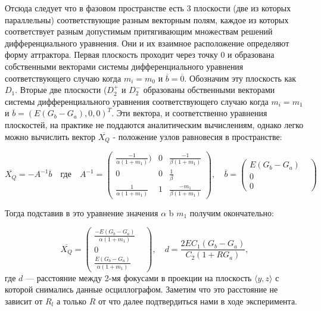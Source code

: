 \documentclass[12pt]{article}
\begin{document}
Отсюда следует что в фазовом пространстве есть 3 плоскости (две из которых параллельны) соответствующие разным  векторным полям, каждое из которых соответствует разным  допустимым притягивающим множествам решений дифференциального уравнения. Они и их взаимное расположение определяют  форму аттрактора. Первая плоскость проходит через точку 0 и образована собственными векторами системы дифференциального уравнения соответствующего случаю когда $m_i = m_0$ и $\overline{b} = \overline{0}$. Обозначим эту плоскость как $D_1$. Вторые две плоскости ($D_2^+$ и $D_2^-$ образованы  обственными векторами системы дифференциального уравнения соответствующего случаю когда $m_i = m_1$ и $\overline{b} = ( E(G_b - G_a),  0,  0)^{T}$. Эти вектора, и соответственно уравнения плоскостей, на практике не поддаются аналитическим вычислениям, однако легко можно вычислить вектор $\overline{X_Q}$  - положение узлов равновесия в пространстве:



\begin{equation}
	\overline{X_Q} = -A^{-1}\overline{b}
	\quad \textit{где} \quad A^{-1}=
	\begin{pmatrix}
		\frac{-1}{\alpha(1+m_{1})}) & 0 & \frac{-1}{\beta(1+m_1)}   \\
		0                           & 0 & \frac{1}{\beta}           \\
		\frac{1}{\alpha(1+m_1)}     & 1 & \frac{-m_1}{\beta(1+m_1)}
	\end{pmatrix},
	\quad \overline{b} =
	\begin{pmatrix}
		E(G_b - G_a) \\
		0 &          \\
		0 &
	\end{pmatrix}
\end{equation}

Тогда подставив в это уравнение значения $\alpha$ b $m_1$ получим окончательно:

\begin{equation}
	\overline{X_Q}=
	\begin{pmatrix}
		\frac{-E(G_b-G_a)}{\alpha(1+m_{1})} \\
		0 &                                  \\
		\frac{E(G_b-G_a)}{\alpha(1+m_1)}
	\end{pmatrix}, \quad d = \frac{2EC_1(G_b -G_a)}{C_2(1+RG_a)},
\end{equation}
где $d$ --- расстояние между 2-мя фокусами в проекции на плоскость $\langle y,z \rangle $ с которой снимались данные осциллографом. Заметим что это расстояние не зависит от $R_l$ а только $R$ от что далее подтвердиться нами в ходе эксперимента.
\end{document}
